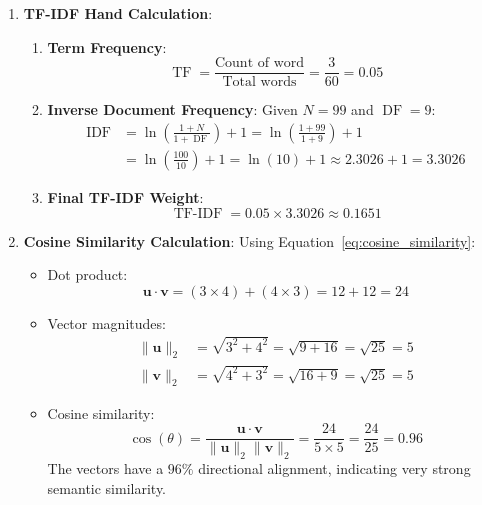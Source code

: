 \begin{enumerate}
    \item \textbf{TF-IDF Hand Calculation}:
    \begin{enumerate}[label=(\alph*)]
        \item \textbf{Term Frequency}:
        \begin{equation*}
        \operatorname{TF} = \frac{\text{Count of word}}{\text{Total words}} = \frac{3}{60} = \mathbf{0.05}
        \end{equation*}

        \item \textbf{Inverse Document Frequency}:
        Given $N = 99$ and $\operatorname{DF} = 9$:
        \begin{align*}
        \operatorname{IDF} &= \ln\left(\frac{1 + N}{1 + \operatorname{DF}}\right) + 1 = \ln\left(\frac{1 + 99}{1 + 9}\right) + 1 \\
                           &= \ln\left(\frac{100}{10}\right) + 1 = \ln(10) + 1 \approx 2.3026 + 1 = \mathbf{3.3026}
        \end{align*}

        \item \textbf{Final TF-IDF Weight}:
        \begin{equation*}
        \operatorname{TF-IDF} = 0.05 \times 3.3026 \approx \mathbf{0.1651}
        \end{equation*}
    \end{enumerate}

    \item \textbf{Cosine Similarity Calculation}:
    Using Equation~\eqref{eq:cosine_similarity}:
    \begin{itemize}
        \item Dot product:
        \begin{equation*}
        \mathbf{u} \cdot \mathbf{v} = (3 \times 4) + (4 \times 3) = 12 + 12 = 24
        \end{equation*}
        \item Vector magnitudes:
        \begin{align*}
        \|\mathbf{u}\|_2 &= \sqrt{3^2 + 4^2} = \sqrt{9 + 16} = \sqrt{25} = 5 \\
        \|\mathbf{v}\|_2 &= \sqrt{4^2 + 3^2} = \sqrt{16 + 9} = \sqrt{25} = 5
        \end{align*}
        \item Cosine similarity:
        \begin{equation*}
        \cos(\theta) = \frac{\mathbf{u} \cdot \mathbf{v}}{\|\mathbf{u}\|_2 \|\mathbf{v}\|_2} = \frac{24}{5 \times 5} = \frac{24}{25} = \mathbf{0.96}
        \end{equation*}
        The vectors have a $96\%$ directional alignment, indicating very strong semantic similarity.
    \end{itemize}


\end{enumerate}
